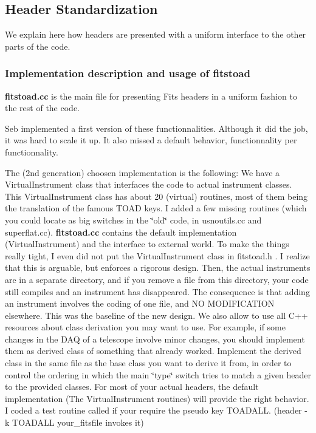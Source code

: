 \subsection{Header Standardization}\label{fitstoad_long}
 We explain here how headers are presented with a uniform interface to the other parts of the code.

\subsubsection{Implementation description and usage of fitstoad}\label{fitstoad_implementation}


{\bf fitstoad.cc} is the main file for presenting Fits headers in a uniform fashion to the rest of the code.

Seb implemented a first version of these functionnalities. Although it did the job, it was hard to scale it up. It also missed a default behavior, functionnality per functionnality.

The (2nd generation) choosen implementation is the following: We have a Virtual\-Instrument class that interfaces the code to actual instrument classes. This Virtual\-Instrument class has about 20 (virtual) routines, most of them being the translation of the famous TOAD keys. I added a few missing routines (which you could locate as big switches in the \char`\"{}old\char`\"{} code, in usnoutils.cc and superflat.cc). {\bf fitstoad.cc} contains the default implementation (Virtual\-Instrument) and the interface to external world. To make the things really tight, I even did not put the Virtual\-Instrument class in fitstoad.h . I realize that this is arguable, but enforces a rigorous design. Then, the actual instruments are in a separate directory, and if you remove a file from this directory, your code still compiles and an instrument has disappeared. The consequence is that adding an instrument involves the coding of one file, and NO MODIFICATION elsewhere. This was the baseline of the new design. We also allow to use all C++ resources about class derivation you may want to use. For example, if some changes in the DAQ of a telescope involve minor changes, you should implement them as derived class of something that already worked. Implement the derived class in the same file as the base class you want to derive it from, in order to control the ordering in which the main \char`\"{}type\char`\"{} switch tries to match a given header to the provided classes. For most of your actual headers, the default implementation  (The Virtual\-Instrument routines) will provide the right behavior. I coded a test routine called if your require the pseudo key TOADALL. (header -k TOADALL your\_\-fitsfile invokes it)

